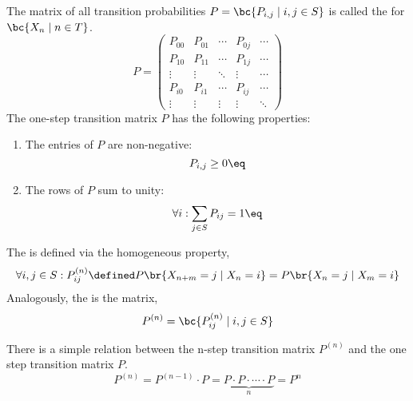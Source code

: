 \documentclass{article}
\begin{document}
The matrix of all transition probabilities $P = \bc{P_{i,j} \mid i,j \in S}$ is called the  for $\bc{X_{n} \mid n \in T}$.
\[ P = \begin{pmatrix}
P_{00} & P_{01} & \cdots & P_{0j} & \cdots \\
P_{10} & P_{11} & \cdots & P_{1j} & \cdots \\
\vdots & \vdots & \ddots & \vdots & \cdots \\
P_{i0} & P_{i1} & \cdots & P_{ij} & \cdots \\
\vdots & \vdots & \vdots & \vdots & \ddots
\end{pmatrix} \]
The one-step transition matrix $P$ has the following properties:
\begin{enumerate}
    \item The entries of $P$ are non-negative:
    \[ P_{i,j} \geq 0 \eq \label{eq:tranS_positive_entries} \]
    \item The rows of $P$ sum to unity:
    \[ \forall i : \sum_{j \in S} P_{ij} = 1 \eq \label{eq:tranS_row_sum} \]
\end{enumerate}

The  is defined via the homogeneous property,
\[ \forall i,j \in S : P_{ij}^{(n)} \defined P\br{X_{n+m} = j \mid X_{n} = i} = P\br{X_{n} = j \mid X_{m} = i} \]
Analogously, the  is the matrix,
\[ P^{(n)} = \bc{P_{ij}^{(n)} \mid i, j \in S} \]

\begin{theorem}
There is a simple relation between the n-step transition matrix $P^{(n)}$ and the one step transition matrix $P$.
\[ P^{(n)} = P^{(n-1)} \cdot P = \underbrace{P \cdot P \cdot \cdots \cdot P}_{n} = P^n \]
\end{theorem}
\end{document}
